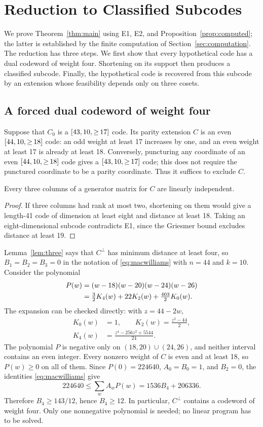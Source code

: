 \section{Reduction to Classified Subcodes}
\label{sec:reduction}
We prove Theorem~\ref{thm:main} using E1, E2, and Proposition~\ref{prop:computed}; the latter is established by the finite computation of Section~\ref{sec:computation}. The reduction has three steps. We first show that every hypothetical code has a dual codeword of weight four. Shortening on its support then produces a classified subcode. Finally, the hypothetical code is recovered from this subcode by an extension whose feasibility depends only on three cosets.

\subsection{A forced dual codeword of weight four}
Suppose that $C_0$ is a $\mbox{\ensuremath{[43,10,{\ge}\,17]}}$ code. Its parity extension $C$ is an even $\mbox{\ensuremath{[44,10,{\ge}\,18]}}$ code: an odd weight at least 17 increases by one, and an even weight at least 17 is already at least 18. Conversely, puncturing any coordinate of an even $\mbox{\ensuremath{[44,10,{\ge}\,18]}}$ code gives a $\mbox{\ensuremath{[43,10,{\ge}\,17]}}$ code; this does not require the punctured coordinate to be a parity coordinate. Thus it suffices to exclude $C$.

\begin{lemma}\label{lem:three}
Every three columns of a generator matrix for $C$ are linearly independent.
\end{lemma}
\begin{proof}
If three columns had rank at most two, shortening on them would give a length-41 code of dimension at least eight and distance at least 18. Taking an eight-dimensional subcode contradicts E1, since the Griesmer bound excludes distance at least 19.
\end{proof}
Lemma~\ref{lem:three} says that $C^\perp$ has minimum distance at least four, so $B_1=B_2=B_3=0$ in the notation of \eqref{eq:macwilliams} with $n=44$ and $k=10$. Consider the polynomial
\begin{align}
 P(w)&=(w-18)(w-20)(w-24)(w-26)\notag\\
 &=\tfrac32K_4(w)+22K_2(w)+\tfrac{403}{2}K_0(w).
 \label{eq:polynomial}
\end{align}
The expansion can be checked directly: with $z=44-2w$,
\begin{align*}
 K_0(w)&=1,\qquad K_2(w)=\frac{z^2-44}{2},\\
 K_4(w)&=\frac{z^4-256z^2+5544}{24}.
\end{align*}
The polynomial $P$ is negative only on $(18,20)\cup(24,26)$, and neither interval contains an even integer. Every nonzero weight of $C$ is even and at least 18, so $P(w)\ge0$ on all of them. Since $P(0)=224640$, $A_0=B_0=1$, and $B_2=0$, the identities \eqref{eq:macwilliams} give
\[
 224640\le\sum_w A_wP(w)=1536B_4+206336.
\]
Therefore $B_4\ge143/12$, hence $B_4\ge12$. In particular, $C^\perp$ contains a codeword of weight four. Only one nonnegative polynomial is needed; no linear program has to be solved.

